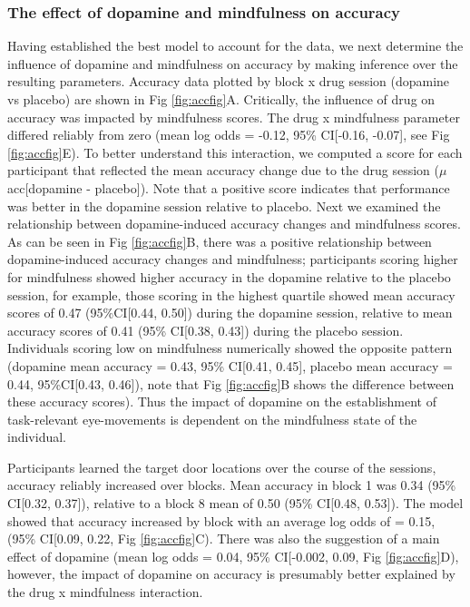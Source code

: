 \documentclass{article}
\begin{document}
\hypertarget{the-effect-of-dopamine-and-mindfulness-on-accuracy}{%
\subsubsection{The effect of dopamine and mindfulness on
accuracy}\label{the-effect-of-dopamine-and-mindfulness-on-accuracy}}

Having established the best model to account for the data, we next
determine the influence of dopamine and mindfulness on accuracy by
making inference over the resulting parameters. Accuracy data plotted by
block x drug session (dopamine vs placebo) are shown in Fig
\ref{fig:accfig}A. Critically, the influence of drug on accuracy was
impacted by mindfulness scores. The drug x mindfulness parameter
differed reliably from zero (mean log odds = -0.12, 95\% CI{[}-0.16,
-0.07{]}, see Fig \ref{fig:accfig}E). To better understand this
interaction, we computed a score for each participant that reflected the
mean accuracy change due to the drug session (\(\mu\) acc{[}dopamine -
placebo{]}). Note that a positive score indicates that performance was
better in the dopamine session relative to placebo. Next we examined the
relationship between dopamine-induced accuracy changes and mindfulness
scores. As can be seen in Fig \ref{fig:accfig}B, there was a positive
relationship between dopamine-induced accuracy changes and mindfulness;
participants scoring higher for mindfulness showed higher accuracy in
the dopamine relative to the placebo session, for example, those scoring
in the highest quartile showed mean accuracy scores of 0.47
(95\%CI{[}0.44, 0.50{]}) during the dopamine session, relative to mean
accuracy scores of 0.41 (95\% CI{[}0.38, 0.43{]}) during the placebo
session. Individuals scoring low on mindfulness numerically showed the
opposite pattern (dopamine mean accuracy = 0.43, 95\% CI{[}0.41,
0.45{]}, placebo mean accuracy = 0.44, 95\%CI{[}0.43, 0.46{]}), note
that Fig \ref{fig:accfig}B shows the difference between these accuracy
scores). Thus the impact of dopamine on the establishment of
task-relevant eye-movements is dependent on the mindfulness state of the
individual.

Participants learned the target door locations over the course of the
sessions, accuracy reliably increased over blocks. Mean accuracy in
block 1 was 0.34 (95\% CI{[}0.32, 0.37{]}), relative to a block 8 mean
of 0.50 (95\% CI{[}0.48, 0.53{]}). The model showed that accuracy
increased by block with an average log odds of = 0.15, (95\% CI{[}0.09,
0.22, Fig \ref{fig:accfig}C). There was also the suggestion of a main
effect of dopamine (mean log odds = 0.04, 95\% CI{[}-0.002, 0.09, Fig
\ref{fig:accfig}D), however, the impact of dopamine on accuracy is
presumably better explained by the drug x mindfulness interaction.
\end{document}

